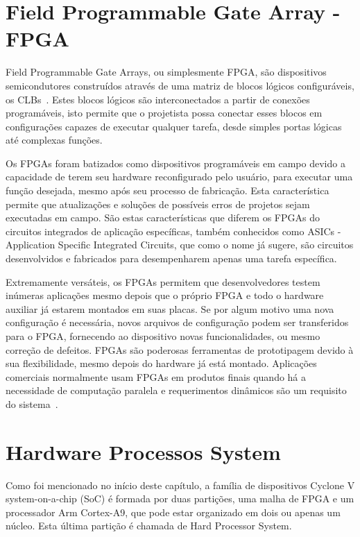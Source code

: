 
\section{Field Programmable Gate Array - FPGA}
Field Programmable Gate Arrays, ou simplesmente FPGA, são dispositivos semicondutores construídos através de uma matriz de blocos lógicos configuráveis, os CLBs~\cite{FPGAXilinx}. Estes blocos lógicos são interconectados a partir de conexões programáveis, isto permite que o projetista possa conectar esses blocos em configurações capazes de executar qualquer tarefa, desde simples portas lógicas até complexas funções.

Os FPGAs foram batizados como dispositivos programáveis em campo devido a capacidade de terem seu hardware reconfigurado pelo usuário, para executar uma função desejada, mesmo após seu processo de fabricação. Esta característica permite que atualizações e soluções de possíveis erros de projetos sejam executadas em campo. São estas características que diferem os FPGAs do circuitos integrados de aplicação específicas, também conhecidos como ASICs - Application Specific Integrated Circuits, que como o nome já sugere, são circuitos desenvolvidos e fabricados para desempenharem apenas uma tarefa específica.

Extremamente versáteis, os FPGAs permitem que desenvolvedores testem inúmeras aplicações mesmo depois que o próprio FPGA e todo o hardware auxiliar já estarem montados em suas placas. Se por algum motivo uma nova configuração é necessária, novos arquivos de configuração podem ser transferidos para o FPGA, fornecendo ao dispositivo novas funcionalidades, ou mesmo correção de defeitos. FPGAs são poderosas ferramentas de prototipagem devido à sua flexibilidade, mesmo depois do hardware já está montado. Aplicações comerciais normalmente usam FPGAs em produtos finais quando há a necessidade de computação paralela e requerimentos dinâmicos são um requisito do sistema~\cite{FPGAarm}.



\section{Hardware Processos System}
Como foi mencionado no início deste capítulo, a família de dispositivos Cyclone V system-on-a-chip (SoC) é formada por duas partições, uma malha de FPGA e um processador Arm Cortex-A9, que pode estar organizado em dois ou apenas um núcleo. Esta última partição é chamada de Hard Processor System. 

